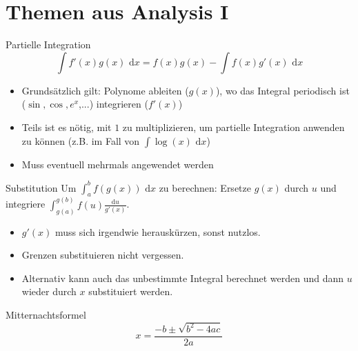 \documentclass[a4paper,10pt]{article}
\def\dx{\text{ d}x}
\begin{document}
    \section{Themen aus Analysis I}
    \begin{mainbox}{Partielle Integration}
        \vspace{-12pt}
        $$\int f'(x) g(x) \dx = f(x)g(x) - \int f(x) g'(x) \dx$$
    \end{mainbox}
    \begin{itemize}
        \item Grundsätzlich gilt: Polynome ableiten ($g(x)$), wo das Integral periodisch ist ($\sin, \cos, e^x$,...) integrieren ($f'(x)$)
        \item Teils ist es nötig, mit $1$ zu multiplizieren, um partielle Integration anwenden zu können (z.B. im Fall von $\int \log(x) \dx$)
        \item Muss eventuell mehrmals angewendet werden
    \end{itemize}
    \begin{mainbox}{Substitution}
        Um $\int_a^b f(g(x)) \dx$ zu berechnen: Ersetze $g(x)$ durch $u$ und integriere $\int_{g(a)}^{g(b)} f(u) \frac{\text{d}u}{g'(x)}$.
    \end{mainbox}
    \begin{itemize}
        \item $g'(x)$ muss sich irgendwie herauskürzen, sonst nutzlos.
        \item Grenzen substituieren nicht vergessen.
        \item Alternativ kann auch das unbestimmte Integral berechnet werden und dann $u$ wieder durch $x$ substituiert werden.
    \end{itemize}
    
    \begin{subbox}{Mitternachtsformel}
        $$x = \frac{-b \pm \sqrt{b^2 - 4ac}}{2a}$$
    \end{subbox}
\end{document}
